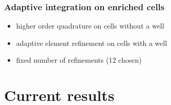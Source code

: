 \documentclass[10pt, xcolor=dvipsnames]{beamer} %
\newcommand{\figpath}{../graphics/}
\begin{document}
\begin{frame}
  \frametitle{Adaptive integration on enriched cells}
  \begin{itemize}
    \item higher order quadrature on cells without a well
    \item adaptive element refinement on cells with a well
    \item fixed number of refinements (12 chosen)
  \end{itemize}
  \centering
  \begin{figure}[!htb]
    \centering    
    \hspace{10pt}
  \end{figure}
\end{frame}


\section{Current results}
\end{document}
